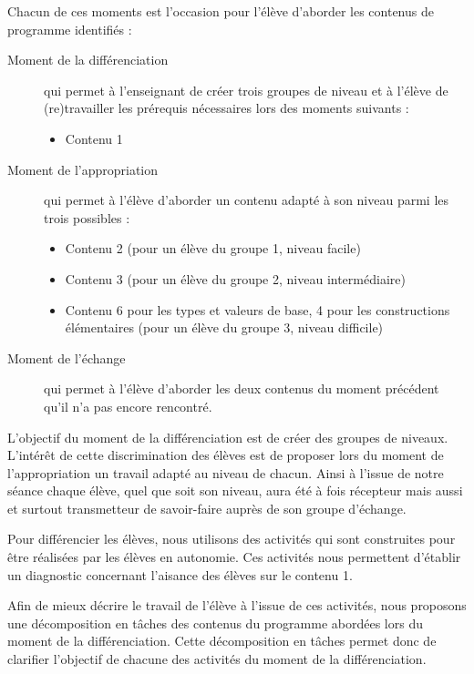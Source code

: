 Chacun de ces moments est l'occasion pour l'élève d'aborder les contenus de programme identifiés :

\begin{description}
    \item[Moment de la différenciation] qui permet à l'enseignant de créer trois groupes de niveau et à l'élève de (re)travailler les prérequis nécessaires lors des moments suivants :
    \begin{itemize}
        \item Contenu 1
    \end{itemize}
    \item[Moment de l'appropriation] qui permet à l'élève d'aborder un contenu adapté à son niveau parmi les trois possibles :
    \begin{itemize}
        \item Contenu 2 (pour un élève du groupe 1, niveau facile)
        \item Contenu 3 (pour un élève du groupe 2, niveau intermédiaire)
        \item Contenu 6 pour les types et valeurs de base, 4 pour les constructions élémentaires (pour un élève du groupe 3, niveau difficile)
    \end{itemize}
    \item[Moment de l'échange] qui permet à l'élève d'aborder les deux contenus du moment précédent qu'il n'a pas encore rencontré.
\end{description}

L'objectif du moment de la différenciation est de créer des groupes de niveaux. L'intérêt de cette discrimination des élèves est de proposer lors du moment de l'appropriation un travail adapté au niveau de chacun.
Ainsi à l'issue de notre séance chaque élève, quel que soit son niveau, aura été à fois récepteur mais aussi et surtout transmetteur de savoir-faire auprès de son groupe d'échange.

Pour différencier les élèves, nous utilisons des activités qui sont construites pour être réalisées par les élèves en autonomie. Ces activités nous permettent d'établir un diagnostic concernant l'aisance des élèves sur le contenu 1.

Afin de mieux décrire le travail de l'élève à l'issue de ces activités, nous proposons une décomposition en tâches des contenus du programme abordées lors du moment de la différenciation. Cette décomposition en tâches permet donc de clarifier l'objectif de chacune des activités du moment de la différenciation.
